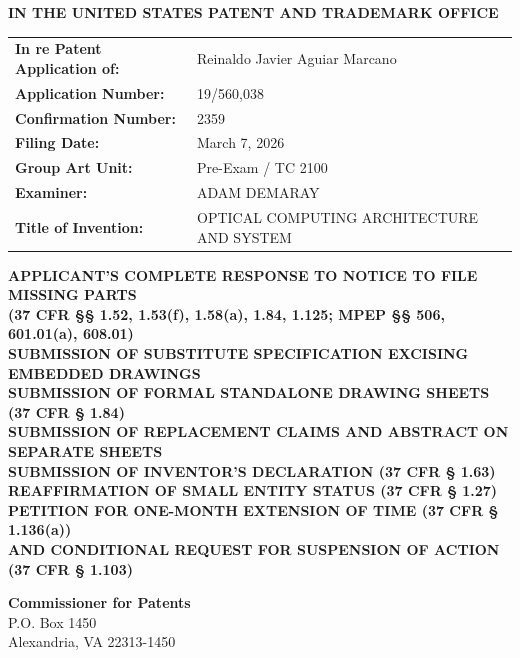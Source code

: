 \documentclass[11pt,letterpaper]{article}
\begin{document}
\thispagestyle{empty}

\begin{center}
    \large\textbf{IN THE UNITED STATES PATENT AND TRADEMARK OFFICE} \\
\end{center}

\vspace{0.3cm}
\noindent\begin{tabular}{p{2.3in}p{4.0in}}
\textbf{In re Patent Application of:} & Reinaldo Javier Aguiar Marcano \\
\textbf{Application Number:} & 19/560,038 \\
\textbf{Confirmation Number:} & 2359 \\
\textbf{Filing Date:} & March 7, 2026 \\
\textbf{Group Art Unit:} & Pre-Exam / TC 2100 \\
\textbf{Examiner:} & ADAM DEMARAY \\
\textbf{Title of Invention:} & OPTICAL COMPUTING ARCHITECTURE AND SYSTEM \\
\end{tabular}

\vspace{0.8cm}
\begin{center}
    \textbf{\large APPLICANT'S COMPLETE RESPONSE TO NOTICE TO FILE MISSING PARTS \\
    (37 CFR \S\S{} 1.52, 1.53(f), 1.58(a), 1.84, 1.125; MPEP \S\S{} 506, 601.01(a), 608.01) \\
    SUBMISSION OF SUBSTITUTE SPECIFICATION EXCISING EMBEDDED DRAWINGS \\
    SUBMISSION OF FORMAL STANDALONE DRAWING SHEETS (37 CFR \S{} 1.84) \\
    SUBMISSION OF REPLACEMENT CLAIMS AND ABSTRACT ON SEPARATE SHEETS \\
    SUBMISSION OF INVENTOR'S DECLARATION (37 CFR \S{} 1.63) \\
    REAFFIRMATION OF SMALL ENTITY STATUS (37 CFR \S{} 1.27) \\
    PETITION FOR ONE-MONTH EXTENSION OF TIME (37 CFR \S{} 1.136(a)) \\
    AND CONDITIONAL REQUEST FOR SUSPENSION OF ACTION (37 CFR \S{} 1.103)}
\end{center}

\vspace{0.3cm}
\noindent\textbf{Commissioner for Patents} \\
\noindent P.O. Box 1450 \\
\noindent Alexandria, VA 22313-1450
\end{document}
